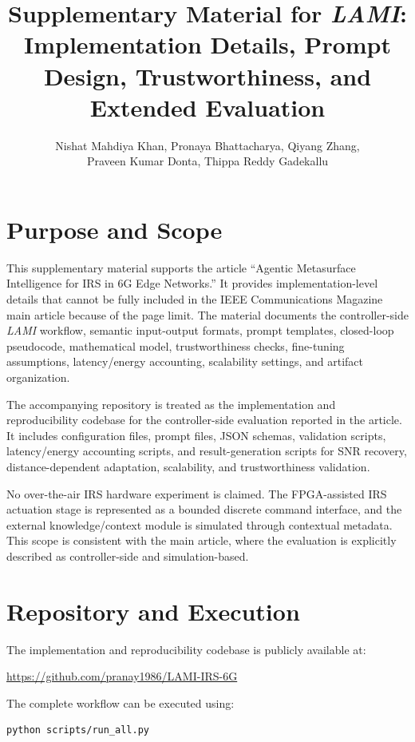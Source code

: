 \documentclass[11pt]{article}
\title{Supplementary Material for \textit{LAMI}: Implementation Details, Prompt Design, Trustworthiness, and Extended Evaluation}
\author{Nishat Mahdiya Khan, Pronaya Bhattacharya, Qiyang Zhang,\\ Praveen Kumar Donta, Thippa Reddy Gadekallu}
\date{}
\begin{document}
\maketitle

\section{Purpose and Scope}

This supplementary material supports the article ``Agentic Metasurface Intelligence for IRS in 6G Edge Networks.'' It provides implementation-level details that cannot be fully included in the IEEE Communications Magazine main article because of the page limit. The material documents the controller-side \textit{LAMI} workflow, semantic input-output formats, prompt templates, closed-loop pseudocode, mathematical model, trustworthiness checks, fine-tuning assumptions, latency/energy accounting, scalability settings, and artifact organization.

The accompanying repository is treated as the implementation and reproducibility codebase for the controller-side evaluation reported in the article. It includes configuration files, prompt files, JSON schemas, validation scripts, latency/energy accounting scripts, and result-generation scripts for SNR recovery, distance-dependent adaptation, scalability, and trustworthiness validation.

No over-the-air IRS hardware experiment is claimed. The FPGA-assisted IRS actuation stage is represented as a bounded discrete command interface, and the external knowledge/context module is simulated through contextual metadata. This scope is consistent with the main article, where the evaluation is explicitly described as controller-side and simulation-based.

\section{Repository and Execution}

The implementation and reproducibility codebase is publicly available at:
\begin{center}
\url{https://github.com/pranay1986/LAMI-IRS-6G}
\end{center}

The complete workflow can be executed using:
\begin{lstlisting}
python scripts/run_all.py
\end{lstlisting}
\end{document}
